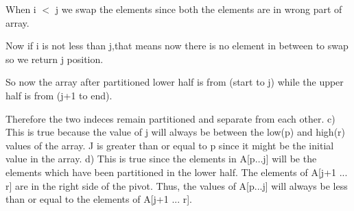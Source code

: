 \documentclass[addpoints,11pt]{exam}
\begin{document}
\begin{questions}
\begin{solutionorbox}
When i $<$ j we swap the elements since both the elements are in wrong part of array. 

Now if i is not less than j,that means now there is no element in between to swap so we return j position.

So now the array after partitioned lower half is from (start to j) while the upper half is from (j+1 to end).

Therefore the two indeces remain partitioned and separate from each other.
\newline
c) \newline
This is true because the value of j will always be between the low(p) and high(r) values of the array. J is greater than or equal to p since it might be the initial value in the array. \newline
d) \newline
This is true since the elements in A[p$\dots$j] will be the elements which have been partitioned in the lower half. The elements of A[j+1 ... r] are in the right side of the pivot. Thus, the values of A[p...j] will always be less than or equal to the elements of A[j+1 ... r].


\end{solutionorbox}


\end{questions}


\end{document}
